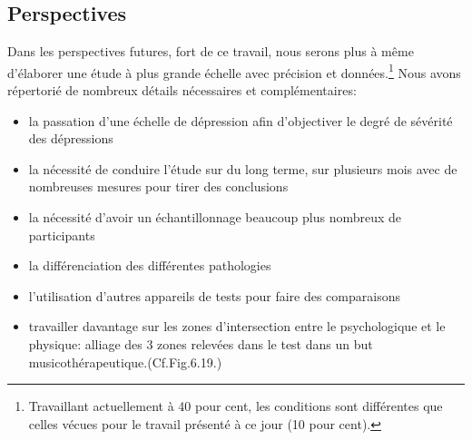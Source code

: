 \subsection{Perspectives}
Dans les perspectives futures, fort de ce travail, nous serons plus à
même d'élaborer une étude à plus grande échelle avec précision et données.\footnote{Travaillant
actuellement à 40 pour
cent, les conditions sont différentes que celles vécues pour le
travail présenté à ce jour (10 pour cent).}
Nous  avons répertorié 
de nombreux détails nécessaires et complémentaires: 
\begin{itemize}

 \item la passation d'une échelle de
     dépression afin d'objectiver le degré de sévérité des
     dépressions
\item  la nécessité de conduire l'étude sur du long terme, sur
  plusieurs mois avec de nombreuses mesures pour tirer des conclusions
 \item   la nécessité
     d'avoir un échantillonnage beaucoup plus nombreux de 
     participants
   \item  la différenciation des différentes pathologies
     \item l'utilisation d'autres appareils de tests pour faire des
       comparaisons
        \item travailler davantage sur les zones d'intersection entre le
          psychologique et le physique: alliage des 3 zones relevées
          dans le test dans un but musicothérapeutique.(Cf.Fig.6.19.)
     

 
 

  
 

\end{itemize}
